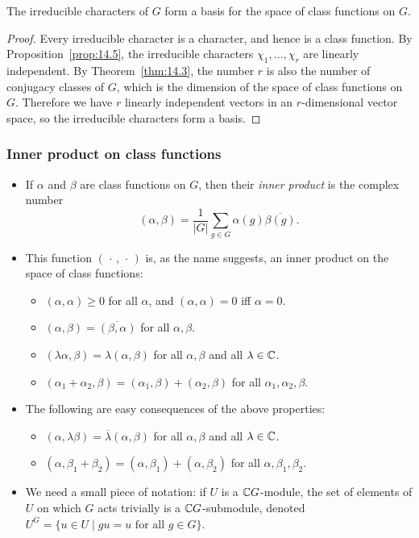 \documentclass[../Odyssey_Project.tex]{subfiles}
\begin{document}
\begin{proposition}
\label{prop:14.10}
The irreducible characters of $G$ form a basis for the space of class functions on $G$.
\end{proposition}
\begin{proof}
    Every irreducible character is a character, and hence is a class function. By Proposition~\ref{prop:14.5}, the irreducible characters $\chi_1,\ldots,\chi_r$ are linearly independent. By Theorem~\ref{thm:14.3}, the number $r$ is also the number of conjugacy classes of $G$, which is the dimension of the space of class functions on $G$. Therefore we have $r$ linearly independent vectors in an $r$-dimensional vector space, so the irreducible characters form a basis.
\end{proof}

\subsubsection*{Inner product on class functions}
\begin{itemize}
    \item If $\alpha$ and $\beta$ are class functions on $G$, then their \emph{inner product} is the complex number
    \[
        (\alpha, \beta) = \frac{1}{|G|} \sum_{g \in G} \alpha(g) \overline{\beta(g)}.
    \]
    \item This function $(\,\cdot\,, \,\cdot\,)$ is, as the name suggests, an inner product on the space of class functions:
    \begin{itemize}
        \item $(\alpha, \alpha) \geq 0$ for all $\alpha$, and $(\alpha, \alpha) = 0$ iff $\alpha = 0$.
        \item $(\alpha, \beta) = \overline{(\beta, \alpha)}$ for all $\alpha, \beta$.
        \item $(\lambda \alpha, \beta) = \lambda(\alpha, \beta)$ for all $\alpha, \beta$ and all $\lambda \in \mathbb{C}$.
        \item $(\alpha_1 + \alpha_2, \beta) = (\alpha_1, \beta) + (\alpha_2, \beta)$ for all $\alpha_1, \alpha_2, \beta$.
    \end{itemize}
    \item The following are easy consequences of the above properties:
    \begin{itemize}
        \item $(\alpha, \lambda \beta) = \overline{\lambda}(\alpha, \beta)$ for all $\alpha, \beta$ and all $\lambda \in \mathbb{C}$.
        \item $(\alpha, \beta_1 + \beta_2) = (\alpha, \beta_1) + (\alpha, \beta_2)$ for all $\alpha, \beta_1, \beta_2$.
    \end{itemize}
    \item We need a small piece of notation: if $U$ is a $\mathbb{C} G$-module, the set of elements of $U$ on which $G$ acts trivially is a $\mathbb{C} G$-submodule, denoted $U^G = \{u \in U \mid gu = u \text{ for all } g \in G\}$.
\end{itemize}
\end{document}
